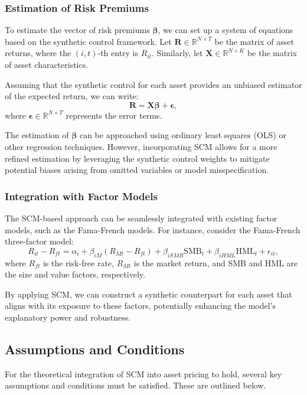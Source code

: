 \subsubsection{Estimation of Risk Premiums}

To estimate the vector of risk premiums $\boldsymbol{\beta}$, we can set up a system of equations based on the synthetic control framework. Let $\mathbf{R} \in \mathbb{R}^{N \times T}$ be the matrix of asset returns, where the $(i,t)$-th entry is $R_{it}$. Similarly, let $\mathbf{X} \in \mathbb{R}^{N \times K}$ be the matrix of asset characteristics.

Assuming that the synthetic control for each asset provides an unbiased estimator of the expected return, we can write:
\[
\mathbf{R} = \mathbf{X} \boldsymbol{\beta} + \boldsymbol{\epsilon},
\]
where $\boldsymbol{\epsilon} \in \mathbb{R}^{N \times T}$ represents the error terms.

The estimation of $\boldsymbol{\beta}$ can be approached using ordinary least squares (OLS) or other regression techniques. However, incorporating SCM allows for a more refined estimation by leveraging the synthetic control weights to mitigate potential biases arising from omitted variables or model misspecification.

\subsubsection{Integration with Factor Models}

The SCM-based approach can be seamlessly integrated with existing factor models, such as the Fama-French models. For instance, consider the Fama-French three-factor model:
\[
R_{it} - R_{ft} = \alpha_i + \beta_{iM} (R_{Mt} - R_{ft}) + \beta_{iSMB} \text{SMB}_t + \beta_{iHML} \text{HML}_t + \epsilon_{it},
\]
where $R_{ft}$ is the risk-free rate, $R_{Mt}$ is the market return, and SMB and HML are the size and value factors, respectively.

By applying SCM, we can construct a synthetic counterpart for each asset that aligns with its exposure to these factors, potentially enhancing the model's explanatory power and robustness.

\subsection{Assumptions and Conditions}

For the theoretical integration of SCM into asset pricing to hold, several key assumptions and conditions must be satisfied. These are outlined below.

